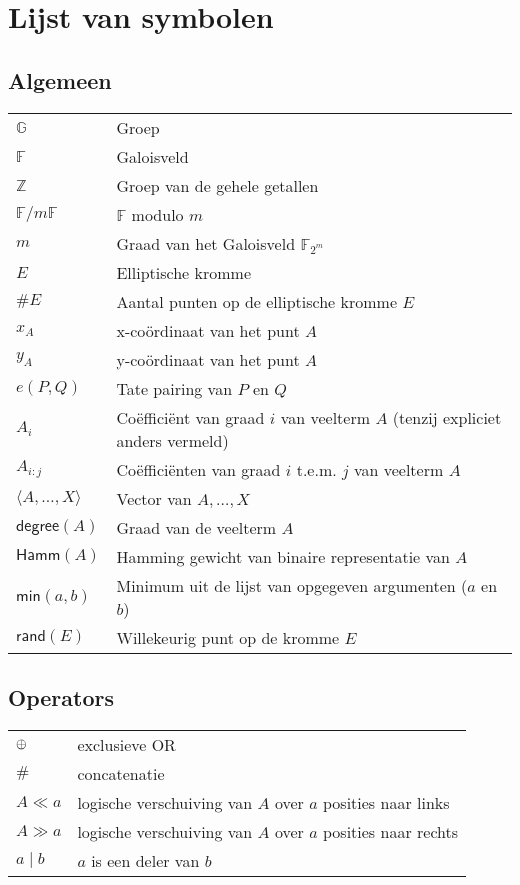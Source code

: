 \chapter*{Lijst van symbolen}

\section*{Algemeen}

\begin{tabular}{l@{$\qquad$}l}
$\mathbb{G}$	& Groep\\
$\mathbb{F}$	& Galoisveld\\
$\mathbb{Z}$	& Groep van de gehele getallen\\
$\mathbb{F}/m\mathbb{F}$	& $\mathbb{F}$ modulo $m$\\
$m$				& Graad van het Galoisveld $\mathbb{F}_{2^m}$\\
$E$				& Elliptische kromme\\
$\#E$				& Aantal punten op de elliptische kromme $E$\\
$x_A$				& x-co\"ordinaat van het punt $A$\\
$y_A$				& y-co\"ordinaat van het punt $A$\\
$e(P, Q)$		& Tate pairing van $P$ en $Q$\\
$A_i$				& Co\"effici\"ent van graad $i$ van veelterm $A$ (tenzij expliciet anders vermeld)\\
$A_{i:j}$		& Co\"effici\"enten van graad $i$ t.e.m. $j$ van veelterm $A$\\
$\langle A, \ldots, X \rangle$	& Vector van $A, \ldots, X$\\
$\textsf{degree}(A)$	& Graad van de veelterm $A$\\
$\textsf{Hamm}(A)$	& Hamming gewicht van binaire representatie van $A$\\
$\textsf{min}(a, b)$	& Minimum  uit de lijst van opgegeven argumenten ($a$ en $b$)\\
$\textsf{rand}(E)$	& Willekeurig punt op de kromme $E$\\
\end{tabular}

\section*{Operators}

\begin{tabular}{l@{$\qquad$}l}
$\oplus$	& exclusieve OR\\
$\#$		& concatenatie\\
$A \ll a$	& logische verschuiving van $A$ over $a$ posities naar links\\
$A \gg a$	& logische verschuiving van $A$ over $a$ posities naar rechts\\
$a \mid b$	& $a$ is een deler van $b$\\
\end{tabular}
